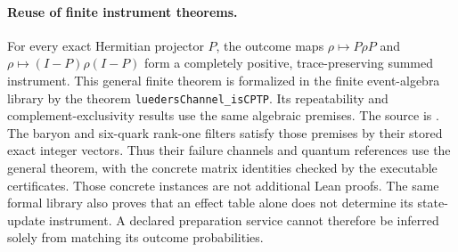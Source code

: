 \paragraph{Reuse of finite instrument theorems.}
For every exact Hermitian projector $P$, the outcome maps
$\rho\mapsto P\rho P$ and $\rho\mapsto(I-P)\rho(I-P)$ form a completely
positive, trace-preserving summed instrument. This general finite theorem
is formalized in the finite event-algebra library by the theorem
\texttt{luedersChannel\_isCPTP}. Its repeatability and complement-exclusivity
results use the same algebraic premises. The source is
.
The baryon and six-quark rank-one filters satisfy those premises by their
stored exact integer vectors. Thus their failure channels and quantum
references use the general theorem, with the concrete matrix identities
checked by the executable certificates. Those concrete instances are not
additional Lean proofs. The same formal library also proves that an effect
table alone does not determine its state-update instrument. A declared
preparation service cannot therefore be inferred solely from matching its
outcome probabilities.
